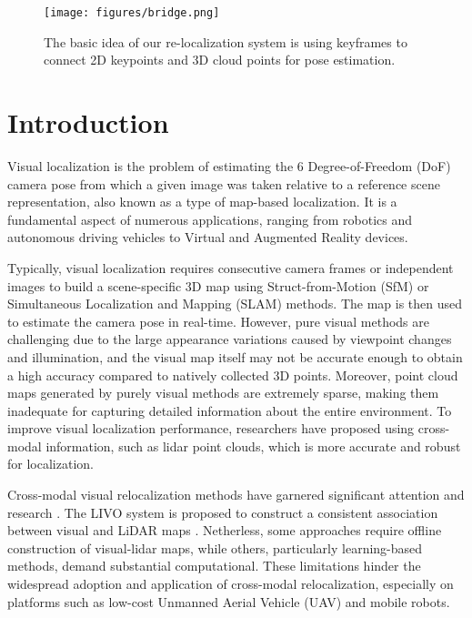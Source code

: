 \documentclass[conference]{./support/ieeeconf}
\begin{document}
\begin{figure}
	\centering
    \texttt{[image: figures/bridge.png]} \label{fig:bridge}
	\caption{The basic idea of our re-localization system is using keyframes to connect 2D keypoints and 3D cloud points for pose estimation.}
\end {figure}
 

\section{Introduction}
{V}{isual} localization is the problem of estimating the 6 Degree-of-Freedom (DoF) camera pose from which a given image was taken relative to a reference scene representation, also known as a type of map-based localization. It is a fundamental aspect of numerous applications, ranging from robotics and autonomous driving vehicles to Virtual and Augmented Reality devices.

Typically, visual localization requires consecutive camera frames or independent images to build a scene-specific 3D map using Struct-from-Motion (SfM) or Simultaneous Localization and Mapping (SLAM) methods. The map is then used to estimate the camera pose in real-time. However, pure visual methods are challenging due to the large appearance variations caused by viewpoint changes and illumination, and the visual map itself may not be accurate enough to obtain a high accuracy compared to natively collected 3D points. Moreover, point cloud maps generated by purely visual methods are extremely sparse, making them inadequate for capturing detailed information about the entire environment. To improve visual localization performance, researchers have proposed using cross-modal information, such as lidar point clouds\cite{caselitz2016monocular}, which is more accurate and robust for localization. 

Cross-modal visual relocalization methods have garnered significant attention and research \cite{zhang2023cross}. The LIVO system is proposed to construct a consistent association between visual and LiDAR maps \cite{lin2022r3live,zheng2022fast}. Netherless, some approaches require offline construction of visual-lidar maps\cite{bai2024colmap}, while others, particularly learning-based methods, demand substantial computational\cite{puligilla2024liploc}. These limitations hinder the widespread adoption and application of cross-modal relocalization, especially on platforms such as low-cost Unmanned Aerial Vehicle (UAV) and mobile robots.
\end{document}
